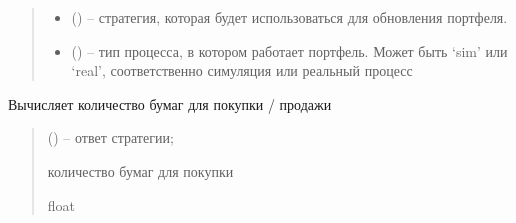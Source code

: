 \documentclass[letterpaper,10pt,english,openany,oneside]{sphinxmanual}
\begin{document}
\begin{fulllineitems}
\begin{fulllineitems}
\begin{quote}
\begin{description}
\begin{itemize}
\item {} 
\sphinxAtStartPar
{} (\sphinxstyleliteralemphasis{\sphinxupquote{{[}}}\sphinxstyleliteralemphasis{\sphinxupquote{{]}}}) – стратегия, которая будет использоваться для обновления портфеля.

\item {} 
\sphinxAtStartPar
{} () – тип процесса, в котором работает портфель. Может быть ‘sim’ или ‘real’, соответственно
симуляция или реальный процесс

\end{itemize}

\end{description}\end{quote}

\end{fulllineitems}


\begin{fulllineitems}
\label{\detokenize{src.structures:src.structures.st_portfolio.Portfolio.calc_amount}}
\pysigstartsignatures
{}
\pysigstopsignatures
\sphinxAtStartPar
Вычисляет количество бумаг для покупки / продажи
\begin{quote}\begin{description}
\sphinxAtStartPar
{} ({\hyperref[\detokenize{src.structures:src.structures.st_strategies.StrategyResponse}]{}}) – ответ стратегии;

\sphinxAtStartPar
количество бумаг для покупки

\sphinxAtStartPar
float

\end{description}\end{quote}

\end{fulllineitems}



\end{fulllineitems}
\end{document}

